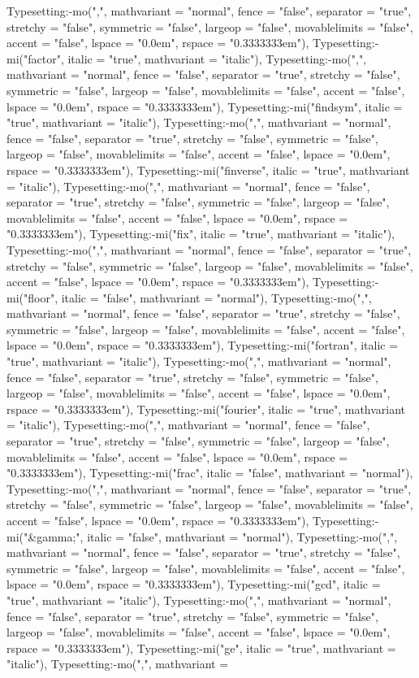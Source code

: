 \documentclass{article}
\begin{document}
{{{\begin{maplegroup}
\begin{maplelatex}
Typesetting:-mo(",", mathvariant = "normal", fence = "false", separator = "true", stretchy = "false", symmetric = "false", largeop = "false", movablelimits = "false", accent = "false", lspace = "0.0em", rspace = "0.3333333em"), Typesetting:-mi("factor", italic = "true", mathvariant = "italic"), Typesetting:-mo(",", mathvariant = "normal", fence = "false", separator = "true", stretchy = "false", symmetric = "false", largeop = "false", movablelimits = "false", accent = "false", lspace = "0.0em", rspace = "0.3333333em"), Typesetting:-mi("findsym", italic = "true", mathvariant = "italic"), Typesetting:-mo(",", mathvariant = "normal", fence = "false", separator = "true", stretchy = "false", symmetric = "false", largeop = "false", movablelimits = "false", accent = "false", lspace = "0.0em", rspace = "0.3333333em"), Typesetting:-mi("finverse", italic = "true", mathvariant = "italic"), Typesetting:-mo(",", mathvariant = "normal", fence = "false", separator = "true", stretchy = "false", symmetric = "false", largeop = "false", movablelimits = "false", accent = "false", lspace = "0.0em", rspace = "0.3333333em"), Typesetting:-mi("fix", italic = "true", mathvariant = "italic"), Typesetting:-mo(",", mathvariant = "normal", fence = "false", separator = "true", stretchy = "false", symmetric = "false", largeop = "false", movablelimits = "false", accent = "false", lspace = "0.0em", rspace = "0.3333333em"), Typesetting:-mi("floor", italic = "false", mathvariant = "normal"), Typesetting:-mo(",", mathvariant = "normal", fence = "false", separator = "true", stretchy = "false", symmetric = "false", largeop = "false", movablelimits = "false", accent = "false", lspace = "0.0em", rspace = "0.3333333em"), Typesetting:-mi("fortran", italic = "true", mathvariant = "italic"), Typesetting:-mo(",", mathvariant = "normal", fence = "false", separator = "true", stretchy = "false", symmetric = "false", largeop = "false", movablelimits = "false", accent = "false", lspace = "0.0em", rspace = "0.3333333em"), Typesetting:-mi("fourier", italic = "true", mathvariant = "italic"), Typesetting:-mo(",", mathvariant = "normal", fence = "false", separator = "true", stretchy = "false", symmetric = "false", largeop = "false", movablelimits = "false", accent = "false", lspace = "0.0em", rspace = "0.3333333em"), Typesetting:-mi("frac", italic = "false", mathvariant = "normal"), Typesetting:-mo(",", mathvariant = "normal", fence = "false", separator = "true", stretchy = "false", symmetric = "false", largeop = "false", movablelimits = "false", accent = "false", lspace = "0.0em", rspace = "0.3333333em"), Typesetting:-mi("&gamma;", italic = "false", mathvariant = "normal"), Typesetting:-mo(",", mathvariant = "normal", fence = "false", separator = "true", stretchy = "false", symmetric = "false", largeop = "false", movablelimits = "false", accent = "false", lspace = "0.0em", rspace = "0.3333333em"), Typesetting:-mi("gcd", italic = "true", mathvariant = "italic"), Typesetting:-mo(",", mathvariant = "normal", fence = "false", separator = "true", stretchy = "false", symmetric = "false", largeop = "false", movablelimits = "false", accent = "false", lspace = "0.0em", rspace = "0.3333333em"), Typesetting:-mi("ge", italic = "true", mathvariant = "italic"), Typesetting:-mo(",", mathvariant = 
\end{maplelatex}
\end{maplegroup}}}}
\end{document}
